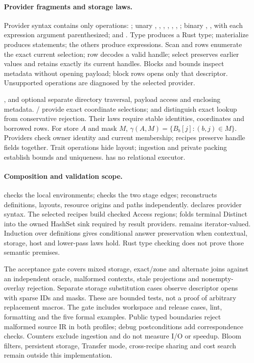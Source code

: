 \paragraph{Provider fragments and storage laws.}
Provider syntax contains only operations:
; unary , , , ,
, , ; binary ,
, with each expression argument parenthesized; and
. Type produces a Rust type;
materialize produces statements; the others produce expressions.
Scan and rows enumerate the exact current selection; row decodes a valid handle;
select preserves earlier values and retains exactly its current handles.
Blocks and bounds inspect metadata without opening payload; block rows opens only
that descriptor. Unsupported operations are diagnosed by the selected provider.

,  and optional 
separate directory traversal, payload access and enclosing metadata.
/ provide exact coordinate selections;
 and  distinguish exact lookup from
conservative rejection. Their laws require stable identities, coordinates and
borrowed rows. For store $A$ and mask $M$, $\gamma(A,M)=\{B_b[j]:(b,j)\in M\}$.
Providers check owner identity and current membership; recipes preserve handle
fields together. Trait operations hide layout; ingestion and private packing
establish bounds and uniqueness.  has no relational executor.

\paragraph{Composition and validation scope.}
 checks the local environments;
 checks the two stage edges;
 reconstructs definitions, layouts, resource origins and
paths independently.  declares provider syntax.
The selected recipes build checked Access regions; 
folds terminal Distinct into the owned HashSet sink required by result providers.
 remains iterator-valued. Induction over definitions gives conditional
answer preservation when contextual, storage, host and lower-pass laws hold.
Rust type checking does not prove those semantic premises.

The acceptance gate covers mixed storage, exact/zone and alternate joins against
an independent oracle, malformed contexts, stale projections and nonempty-overlay
rejection. Separate storage substitution cases observe descriptor opens with sparse
IDs and masks. These are bounded tests, not a proof of arbitrary replacement macros.
The gate includes workspace and release cases, lint, formatting and the
five formal examples. Public typed boundaries reject malformed source IR in both
profiles; debug postconditions add correspondence checks. Counters exclude ingestion and do not
measure I/O or speedup. Bloom filters, persistent storage, Transfer mode, cross-recipe
sharing and cost search remain outside this implementation.
